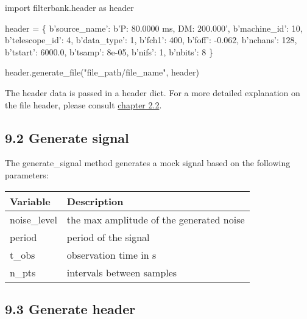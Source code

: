 \documentclass[]{article}
\newenvironment{Shaded}{}{}
\newcommand{\DecValTok}[1]{\textcolor[rgb]{0.25,0.63,0.44}{#1}}
\newcommand{\FloatTok}[1]{\textcolor[rgb]{0.25,0.63,0.44}{#1}}
\newcommand{\StringTok}[1]{\textcolor[rgb]{0.25,0.44,0.63}{#1}}
\newcommand{\ImportTok}[1]{#1}
\newcommand{\OperatorTok}[1]{\textcolor[rgb]{0.40,0.40,0.40}{#1}}
\newcommand{\NormalTok}[1]{#1}
\begin{document}
\begin{Shaded}
\begin{Highlighting}[]
\ImportTok{import}\NormalTok{ filterbank.header }\ImportTok{as}\NormalTok{ header}

\NormalTok{header }\OperatorTok{=}\NormalTok{ \{}
\NormalTok{    b}\StringTok{'source_name'}\NormalTok{: b}\StringTok{'P: 80.0000 ms, DM: 200.000'}\NormalTok{,}
\NormalTok{    b}\StringTok{'machine_id'}\NormalTok{: }\DecValTok{10}\NormalTok{,}
\NormalTok{    b}\StringTok{'telescope_id'}\NormalTok{: }\DecValTok{4}\NormalTok{,}
\NormalTok{    b}\StringTok{'data_type'}\NormalTok{: }\DecValTok{1}\NormalTok{,}
\NormalTok{    b}\StringTok{'fch1'}\NormalTok{: }\DecValTok{400}\NormalTok{,}
\NormalTok{    b}\StringTok{'foff'}\NormalTok{: }\OperatorTok{-}\FloatTok{0.062}\NormalTok{,}
\NormalTok{    b}\StringTok{'nchans'}\NormalTok{: }\DecValTok{128}\NormalTok{,}
\NormalTok{    b}\StringTok{'tstart'}\NormalTok{: }\FloatTok{6000.0}\NormalTok{,}
\NormalTok{    b}\StringTok{'tsamp'}\NormalTok{: }\FloatTok{8e-05}\NormalTok{,}
\NormalTok{    b}\StringTok{'nifs'}\NormalTok{: }\DecValTok{1}\NormalTok{,}
\NormalTok{    b}\StringTok{'nbits'}\NormalTok{: }\DecValTok{8}
\NormalTok{\}}

\NormalTok{header.generate_file(}\StringTok{"file_path/file_name"}\NormalTok{, header)}
\end{Highlighting}
\end{Shaded}

The header data is passed in a header dict. For a more detailed
explanation on the file header, please consult
\href{docs/filterbank.md\#22-read-the-header-from-filterbank-data}{chapter
2.2}.

\subsection{9.2 Generate signal}\label{generate-signal}

The generate\_signal method generates a mock signal based on the
following parameters:

\begin{longtable}[]{@{}ll@{}}
\toprule
Variable & Description\tabularnewline
\midrule
\endhead
noise\_level & the max amplitude of the generated noise\tabularnewline
period & period of the signal\tabularnewline
t\_obs & observation time in s\tabularnewline
n\_pts & intervals between samples\tabularnewline
\bottomrule
\end{longtable}

\subsection{9.3 Generate header}\label{generate-header}
\end{document}
